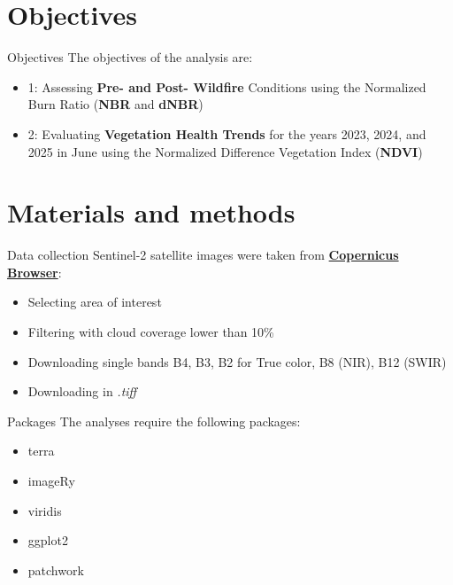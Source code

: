 \documentclass{beamer}
\begin{document}
\section{Objectives} %

\begin{frame}{Objectives}
    The objectives of the analysis are:
    \bigskip
    \begin{itemize}
    \item    1: Assessing \textbf{Pre- and Post- Wildfire} Conditions using the Normalized Burn Ratio (\textbf{NBR} and \textbf{dNBR})

 \bigskip
    
    \item   2: Evaluating \textbf{Vegetation Health Trends}  for the years 2023, 2024, and 2025 in June using the Normalized Difference Vegetation Index (\textbf{NDVI}) 
    \end{itemize}
\end{frame}

\section{Materials and methods} %
\begin{frame}{Data collection}
    Sentinel-2 satellite images were taken from 
    \textbf{\href{https://browser.dataspace.copernicus.eu}{Copernicus Browser}}:
    \bigskip
    \begin{itemize}
        \item  Selecting area of interest
        \item  Filtering with cloud coverage lower than 10\%
        \item Downloading single bands B4, B3, B2 for True color, B8 (NIR), B12 (SWIR)
        \item Downloading in \textit{.tiff}
    \end{itemize}
\end{frame}

\begin{frame}{Packages} %
    The analyses require the following packages:
    \bigskip %
    \begin{itemize} %
        \item terra
        \item imageRy
        \item viridis
        \item ggplot2
        \item patchwork
    \end{itemize}
\end{frame}
\end{document}
